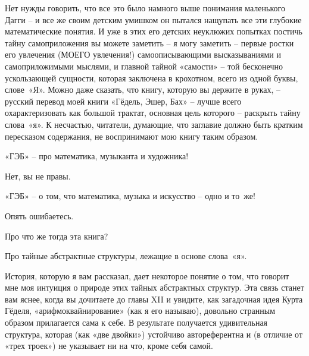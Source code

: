 \documentclass[../main.tex]{subfiles}
\begin{document}
Нет нужды говорить, что все это было намного выше понимания маленького Дагги \--- и все же своим детским умишком он пытался нащупать все эти глубокие математические понятия. И уже в этих его детских неуклюжих попытках постичь тайну самоприложения вы можете заметить \--- я могу заметить \--- первые ростки его увлечения (МОЕГО увлечения!) самоописывающими высказываниями и самоприложимыми мыслями, и главной тайной «самости» \--- той бесконечно ускользающей сущности, которая заключена в крохотном, всего из одной буквы, слове~«Я». Можно даже сказать, что книгу, которую вы держите в руках, \--- русский перевод моей книги «Гёдель, Эшер, Бах» \--- лучше всего охарактеризовать как большой трактат, основная цель которого \--- раскрыть тайну слова~«я». К несчастью, читатели, думающие, что заглавие должно быть кратким пересказом содержания, не воспринимают мою книгу таким образом.

\begin{adjustwidth}{\parindent}{}
\begin{dialogue}
 «ГЭБ» \--- про математика, музыканта и художника!

 Нет, вы не правы.

 «ГЭБ» \--- о том, что математика, музыка и искусство \--- одно и то~же!

 Опять ошибаетесь.

 Про что же тогда эта книга?

 Про тайные абстрактные структуры, лежащие в основе слова~«я».
\end{dialogue}
\end{adjustwidth}

История, которую я вам рассказал, дает некоторое понятие о том, что говорит мне моя интуиция о природе этих тайных абстрактных структур. Эта связь станет вам яснее, когда вы дочитаете до главы XII и увидите, как загадочная идея Курта Гёделя, «арифмоквайнирование» (как я его называю), довольно странным образом прилагается сама к себе. В результате получается удивительная структура, которая (как «две двойки») устойчиво автореферентна и (в отличие от «трех троек») не указывает ни на что, кроме себя самой.
\end{document}
